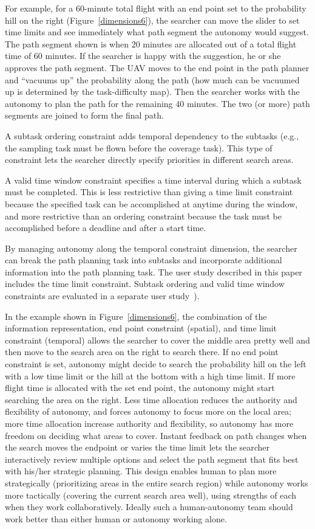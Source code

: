 For example, for a 60-minute total flight with an end point set to the probability hill on the right (Figure~\ref{dimensions6}), the searcher can move the slider to set time limits and see immediately what path segment the autonomy would suggest. The path segment shown is when 20 minutes are allocated out of a total flight time of 60 minutes. If the searcher is happy with the suggestion, he or she approves the path segment. The UAV moves to the end point in the path planner and ``vacuums up'' the probability along the path (how much can be vacuumed up is determined by the task-difficulty map). Then the searcher works with the autonomy to plan the path for the remaining 40 minutes. The two (or more) path segments are joined to form the final path.

A subtask ordering constraint adds temporal dependency to the subtasks (e.g., the sampling task must be flown before the coverage task). This type of constraint lets the searcher directly specify priorities in different search areas. 

A valid time window constraint specifies a time interval during which a subtask must be completed.  This is less restrictive than giving a time limit constraint because the specified task can be accomplished at anytime during the window, and more restrictive than an ordering constraint because the task must be accomplished before a deadline and after a start time. 

By managing autonomy along the temporal constraint dimension, the searcher can break the path planning task into subtasks and incorporate additional information into the path planning task. The user study described in this paper includes the time limit constraint. Subtask ordering and valid time window constraints are evaluated in a separate user study~\cite{Clark2013Hierarchical}).

In the example shown in Figure~\ref{dimensions6}, the combination of the information representation, end point constraint (spatial), and time limit constraint (temporal) allows the searcher to cover the middle area pretty well and then move to the search area on the right to search there. If no end point constraint is set, autonomy might decide to search the probability hill on the left with a low time limit or the hill at the bottom with a high time limit. If more flight time is allocated with the set end point, the autonomy might start searching the area on the right. Less time allocation reduces the authority and flexibility of autonomy, and forces autonomy to focus more on the local area; more time allocation increase authority and flexibility, so autonomy has more freedom on deciding what areas to cover. Instant feedback on path changes when the search moves the endpoint or varies the time limit lets the searcher interactively review multiple options and select the path segment that fits best with his/her strategic planning. This design enables human to plan more strategically (prioritizing areas in the entire search region) while autonomy works more tactically (covering the current search area well), using strengths of each when they work collaboratively. Ideally such a human-autonomy team should work better than either human or autonomy working alone.


